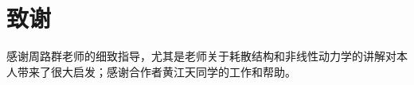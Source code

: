 \documentclass[aps,pre,12pt,preprint,%
	onecolumn,showpacs,showkeys,nofootinbib]{revtex4-1}
\begin{document}
\section{致谢}
\vspace{-.5\baselineskip}
	感谢周路群老师的细致指导，尤其是老师关于耗散结构和非线性动力学的讲解对本人带来了很大启发；感谢合作者黄江天同学的工作和帮助。
\vspace{.5\baselineskip}

\setlength{\bibsep}{1ex}
\linespread{1.}\selectfont

%

\clearpage
\linespread{1.5}\selectfont
\end{document}
